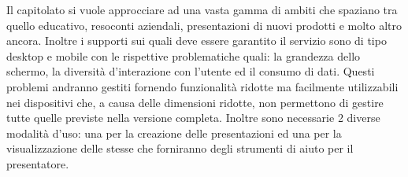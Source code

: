 Il capitolato si vuole approcciare ad una vasta gamma di ambiti che spaziano tra quello educativo, resoconti aziendali, presentazioni di nuovi prodotti e molto altro ancora.
Inoltre i supporti sui quali deve essere garantito il servizio sono di tipo desktop e mobile con le rispettive problematiche quali: la grandezza dello schermo, la diversità d’interazione con l’utente ed il consumo di dati. Questi problemi andranno gestiti fornendo funzionalità ridotte ma facilmente utilizzabili nei dispositivi che, a causa delle dimensioni ridotte, non permettono di gestire tutte quelle previste nella versione completa.
Inoltre sono necessarie 2 diverse modalità d’uso: una per la creazione delle presentazioni ed una per la visualizzazione delle stesse che forniranno degli strumenti di aiuto per il presentatore.
